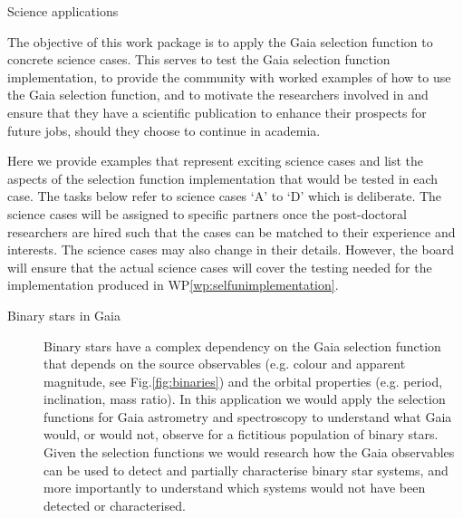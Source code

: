 \begin{workpackage}{Science applications}
  \label{wp:scienceappl}
  \wpend{\duration} %

  \makewptable %

  \begin{wpobjectives}
    The objective of this work package is to apply the Gaia selection function to concrete science cases. This serves to test the Gaia selection function implementation, to provide the community with worked examples of how to use the Gaia selection function, and to motivate the researchers involved in {\acro} and ensure that they have a scientific publication to enhance their prospects for future jobs, should they choose to continue in academia.
    
    Here we provide examples that represent exciting science cases and list the aspects of the selection function implementation that would be tested in each case. The tasks below refer to science cases `A' to `D' which is deliberate. The science cases will be assigned to specific {\acro} partners once the post-doctoral researchers are hired such that the cases can be matched to their experience and interests. The science cases may also change in their details. However, the {\acro} board will ensure that the actual science cases will cover the testing needed for the implementation produced in WP\ref{wp:selfunimplementation}.
    
    \begin{description}
      \item[Binary stars in Gaia] {
        Binary stars have a complex dependency on the Gaia selection function that depends on the source observables (e.g. colour and apparent magnitude, see Fig.\ref{fig:binaries}) and the orbital properties (e.g. period, inclination, mass ratio). In this application we would apply the selection functions for Gaia astrometry and spectroscopy to understand what Gaia would, or would not, observe for a fictitious population of binary stars. Given the selection functions we would research how the Gaia observables can be used to detect and partially characterise binary star systems, and more importantly to understand which systems would not have been detected or characterised. 

}
\end{description}
\end{wpobjectives}
\end{workpackage}
